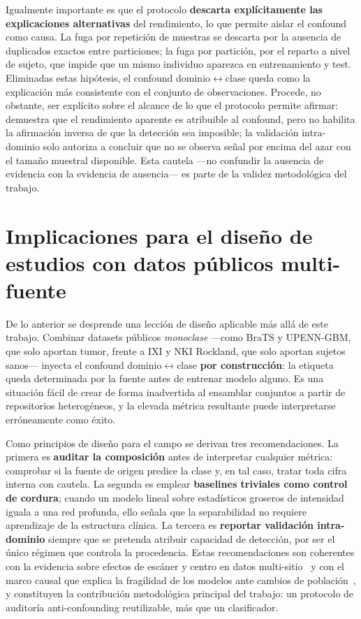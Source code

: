 Igualmente importante es que el protocolo \textbf{descarta explícitamente las
explicaciones alternativas} del rendimiento, lo que permite aislar el confound
como causa. La fuga por repetición de muestras se descarta por la ausencia de
duplicados exactos entre particiones; la fuga por partición, por el reparto a
nivel de sujeto, que impide que un mismo individuo aparezca en entrenamiento y
test. Eliminadas estas hipótesis, el confound dominio$\leftrightarrow$clase queda como la
explicación más consistente con el conjunto de observaciones. Procede, no obstante,
ser explícito sobre el alcance de lo que el protocolo permite afirmar: demuestra
que el rendimiento aparente es atribuible al confound, pero no habilita la
afirmación inversa de que la detección sea imposible; la validación intra-dominio
solo autoriza a concluir que no se observa señal por encima del azar con el
tamaño muestral disponible. Esta cautela ---no confundir la ausencia de evidencia
con la evidencia de ausencia--- es parte de la validez metodológica del trabajo.

\section{Implicaciones para el diseño de estudios con datos públicos multi-fuente}

De lo anterior se desprende una lección de diseño aplicable más allá de este
trabajo. Combinar datasets públicos \emph{monoclase} ---como BraTS y UPENN-GBM,
que solo aportan tumor, frente a IXI y NKI Rockland, que solo aportan sujetos
sanos--- inyecta el confound dominio$\leftrightarrow$clase \textbf{por construcción}: la etiqueta
queda determinada por la fuente antes de entrenar modelo alguno. Es una situación
fácil de crear de forma inadvertida al ensamblar conjuntos a partir de
repositorios heterogéneos, y la elevada métrica resultante puede interpretarse
erróneamente como éxito.

Como principios de diseño para el campo se derivan tres recomendaciones. La
primera es \textbf{auditar la composición} antes de interpretar cualquier
métrica: comprobar si la fuente de origen predice la clase y, en tal caso, tratar
toda cifra interna con cautela. La segunda es emplear \textbf{baselines triviales
como control de cordura}; cuando un modelo lineal sobre estadísticos groseros de
intensidad iguala a una red profunda, ello señala que la separabilidad no
requiere aprendizaje de la estructura clínica. La tercera es \textbf{reportar
validación intra-dominio} siempre que se pretenda atribuir capacidad de
detección, por ser el único régimen que controla la procedencia. Estas
recomendaciones son coherentes con la evidencia sobre efectos de escáner y centro
en datos multi-sitio~\cite{glocker2019scanner} y con el marco causal que explica
la fragilidad de los modelos ante cambios de
población~\cite{castro2020causality}, y constituyen la contribución metodológica
principal del trabajo: un protocolo de auditoría anti-confounding reutilizable,
más que un clasificador.
